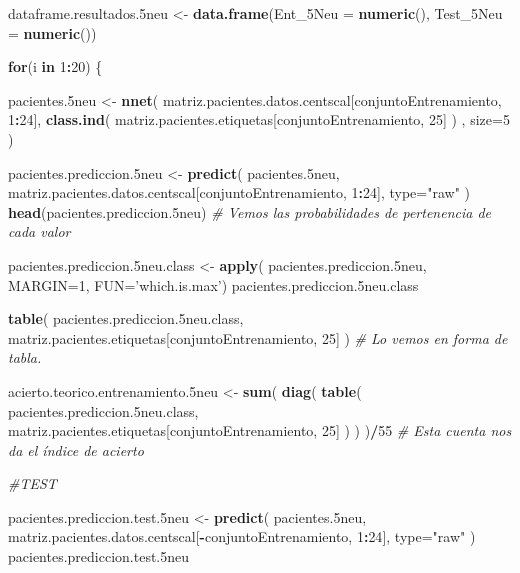 \documentclass[]{article}
\newenvironment{Shaded}{\begin{snugshade}}{\end{snugshade}}
\newcommand{\KeywordTok}[1]{\textcolor[rgb]{0.13,0.29,0.53}{\textbf{#1}}}
\newcommand{\DataTypeTok}[1]{\textcolor[rgb]{0.13,0.29,0.53}{#1}}
\newcommand{\DecValTok}[1]{\textcolor[rgb]{0.00,0.00,0.81}{#1}}
\newcommand{\StringTok}[1]{\textcolor[rgb]{0.31,0.60,0.02}{#1}}
\newcommand{\CommentTok}[1]{\textcolor[rgb]{0.56,0.35,0.01}{\textit{#1}}}
\newcommand{\ControlFlowTok}[1]{\textcolor[rgb]{0.13,0.29,0.53}{\textbf{#1}}}
\newcommand{\OperatorTok}[1]{\textcolor[rgb]{0.81,0.36,0.00}{\textbf{#1}}}
\newcommand{\NormalTok}[1]{#1}
\begin{document}
\begin{Shaded}
\begin{Highlighting}[]
\NormalTok{dataframe.resultados.5neu <-}\StringTok{ }\KeywordTok{data.frame}\NormalTok{(}\DataTypeTok{Ent_5Neu =} \KeywordTok{numeric}\NormalTok{(),}
                                        \DataTypeTok{Test_5Neu =} \KeywordTok{numeric}\NormalTok{())}

\ControlFlowTok{for}\NormalTok{(i }\ControlFlowTok{in} \DecValTok{1}\OperatorTok{:}\DecValTok{20}\NormalTok{)}
\NormalTok{\{}

\NormalTok{  pacientes.5neu <-}\StringTok{ }\KeywordTok{nnet}\NormalTok{( matriz.pacientes.datos.centscal[conjuntoEntrenamiento, }\DecValTok{1}\OperatorTok{:}\DecValTok{24}\NormalTok{], }\KeywordTok{class.ind}\NormalTok{( matriz.pacientes.etiquetas[conjuntoEntrenamiento, }\DecValTok{25}\NormalTok{] ) , }\DataTypeTok{size=}\DecValTok{5}\NormalTok{ )}
  
\NormalTok{  pacientes.prediccion.5neu <-}\StringTok{ }\KeywordTok{predict}\NormalTok{( pacientes.5neu, matriz.pacientes.datos.centscal[conjuntoEntrenamiento, }\DecValTok{1}\OperatorTok{:}\DecValTok{24}\NormalTok{], }\DataTypeTok{type=}\StringTok{"raw"}\NormalTok{ )}
  \KeywordTok{head}\NormalTok{(pacientes.prediccion.5neu) }\CommentTok{# Vemos las probabilidades de pertenencia de cada valor}
  
\NormalTok{  pacientes.prediccion.5neu.class <-}\StringTok{ }\KeywordTok{apply}\NormalTok{( pacientes.prediccion.5neu, }\DataTypeTok{MARGIN=}\DecValTok{1}\NormalTok{, }\DataTypeTok{FUN=}\StringTok{'which.is.max'}\NormalTok{)}
\NormalTok{  pacientes.prediccion.5neu.class}
  
  \KeywordTok{table}\NormalTok{( pacientes.prediccion.5neu.class, matriz.pacientes.etiquetas[conjuntoEntrenamiento, }\DecValTok{25}\NormalTok{] )  }\CommentTok{# Lo vemos en forma de tabla.}
  
\NormalTok{  acierto.teorico.entrenamiento.5neu <-}\StringTok{ }\KeywordTok{sum}\NormalTok{( }\KeywordTok{diag}\NormalTok{( }\KeywordTok{table}\NormalTok{( pacientes.prediccion.5neu.class, matriz.pacientes.etiquetas[conjuntoEntrenamiento, }\DecValTok{25}\NormalTok{] ) ) )}\OperatorTok{/}\DecValTok{55} \CommentTok{# Esta cuenta nos da el índice de acierto}
  
  \CommentTok{#TEST}
  
\NormalTok{  pacientes.prediccion.test.5neu <-}\StringTok{ }\KeywordTok{predict}\NormalTok{( pacientes.5neu, matriz.pacientes.datos.centscal[}\OperatorTok{-}\NormalTok{conjuntoEntrenamiento, }\DecValTok{1}\OperatorTok{:}\DecValTok{24}\NormalTok{], }\DataTypeTok{type=}\StringTok{"raw"}\NormalTok{ )}
\NormalTok{  pacientes.prediccion.test.5neu}
  

\end{Highlighting}
\end{Shaded}
\end{document}

